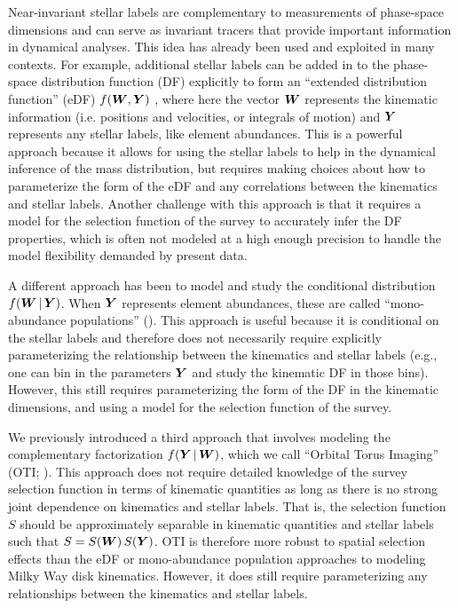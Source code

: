 \documentclass[modern]{aastex631}
\begin{document}
Near-invariant stellar labels are complementary to measurements of phase-space
dimensions and can serve as invariant tracers that provide important information in
dynamical analyses.
This idea has already been used and exploited in many contexts.
For example, additional stellar labels can be added in to the phase-space distribution
function (DF) explicitly to form an ``extended distribution function'' (eDF) $f(\boldsymbol{W},
\boldsymbol{Y})$ \citep[e.g.,][]{Sanders:2015, Binney:2023}, where here the vector $\boldsymbol{W}$
represents the kinematic information (i.e. positions and velocities, or integrals of
motion) and $\boldsymbol{Y}$ represents any stellar labels, like element abundances.
This is a powerful approach because it allows for using the stellar labels to help in
the dynamical inference of the mass distribution, but requires making choices about how
to parameterize the form of the eDF and any correlations between the kinematics and
stellar labels.
Another challenge with this approach is that it requires a model for the selection
function of the survey to accurately infer the DF properties, which is often not modeled
at a high enough precision to handle the model flexibility demanded by present data.

A different approach has been to model and study the conditional distribution $f(\boldsymbol{W}
\,|\, \boldsymbol{Y})$.
When $\boldsymbol{Y}$ represents element abundances, these are called ``mono-abundance
populations'' (\citealt{Bovy:2012,Bovy:2016}).
This approach is useful because it is conditional on the stellar labels and therefore
does not necessarily require explicitly parameterizing the relationship between the
kinematics and stellar labels (e.g., one can bin in the parameters $\boldsymbol{Y}$ and study
the kinematic DF in those bins).
However, this still requires parameterizing the form of the DF in the kinematic
dimensions, and using a model for the selection function of the survey.

We previously introduced a third approach that involves modeling the complementary
factorization $f(\boldsymbol{Y} \,|\, \boldsymbol{W})$, which we call ``Orbital Torus Imaging'' (OTI;
\citealt{PW:2021}).
This approach does not require detailed knowledge of the survey selection function in
terms of kinematic quantities as long as there is no strong joint dependence on
kinematics and stellar labels.
That is, the selection function $S$ should be approximately separable in kinematic
quantities and stellar labels such that $S = S(\boldsymbol{W}) \,S(\boldsymbol{Y})$.
OTI is therefore more robust to spatial selection effects than the eDF or mono-abundance
population approaches to modeling Milky Way disk kinematics.
However, it does still require parameterizing any relationships between the kinematics
and stellar labels.
\end{document}
